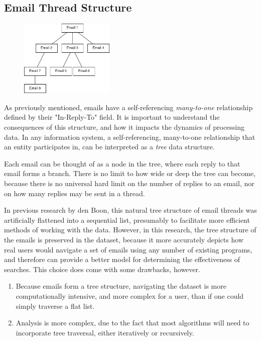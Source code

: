 \documentclass[a4paper, 12pt]{article}
\begin{document}
	\subsection{Email Thread Structure}
		\begin{figure}
			\label{fig:email-threads}
			\includegraphics[width=0.4\textwidth]{img/email-threads.png}
		\end{figure}
	
		As previously mentioned, emails have a self-referencing \textit{many-to-one} relationship defined by their "In-Reply-To" field. It is important to understand the consequences of this structure, and how it impacts the dynamics of processing data. In any information system, a self-referencing, many-to-one relationship that an entity participates in, can be interpreted as a \textit{tree} data structure.
	
		Each email can be thought of as a node in the tree, where each reply to that email forms a branch. There is no limit to how wide or deep the tree can become, because there is no universal hard limit on the number of replies to an email, nor on how many replies may be sent in a thread.
		
		In previous research by den Boon, this natural tree structure of email threads was artificially flattened into a sequential list, presumably to facilitate more efficient methods of working with the data\autocite{denboon}. However, in this research, the tree structure of the emails is preserved in the dataset, because it more accurately depicts how real users would navigate a set of emails using any number of existing programs, and therefore can provide a better model for determining the effectiveness of searches. This choice does come with some drawbacks, however.
		
		\begin{enumerate}
			\item Because emails form a tree structure, navigating the dataset is more computationally intensive, and more complex for a user, than if one could simply traverse a flat list.
			\item Analysis is more complex, due to the fact that most algorithms will need to incorporate tree traversal, either iteratively or recursively.
		\end{enumerate}
			
\end{document}
